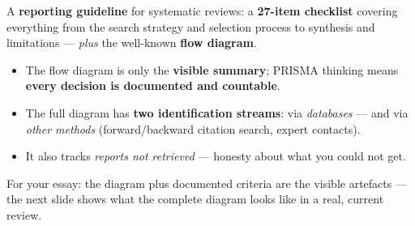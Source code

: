 \documentclass[11pt,a4paper,british,twoside=false,headings=small,chapterprefix=false,numbers=noenddot]{scrbook}
\newenvironment{block}[1]{\begin{tcolorbox}[scriptbox, title={#1}]}{\end{tcolorbox}}
\begin{document}
\begin{center}\small
\begin{block}{PRISMA 2020 (Page et al., 2021)}
    A \textbf{reporting guideline} for systematic reviews: a
    \textbf{27-item checklist} covering everything from the search strategy
    and selection process to synthesis and limitations --- \emph{plus} the
    well-known \textbf{flow diagram}.
  \end{block}
  
  \begin{itemize}\setlength{\itemsep}{0.4em}
    \item The flow diagram is only the \textbf{visible summary}; PRISMA
          thinking means \textbf{every decision is documented and countable}.
    \item The full diagram has \textbf{two identification streams}:
          via \emph{databases} --- and via \emph{other methods}
          (forward/backward citation search, expert contacts).
    \item It also tracks \emph{reports not retrieved} --- honesty about what
          you could not get.
  \end{itemize}
  
  For your essay: the diagram plus documented criteria are the visible
  artefacts --- the next slide shows what the complete diagram looks like in
  a real, current review.
\end{center}
\end{document}
